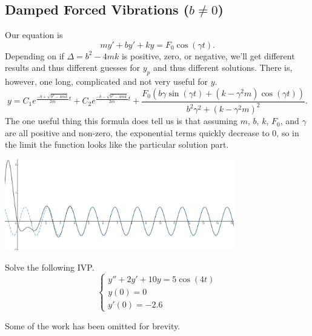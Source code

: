 \subsection{Damped Forced Vibrations ($b \neq 0$)}
\noindent
Our equation is 
\begin{equation*}
	my' + by' + ky = F_0\cos{(\gamma t)}.
\end{equation*}
Depending on if $\Delta = b^2 - 4mk$ is positive, zero, or negative, we'll get different results and thus different guesses for $y_p$ and thus different solutions.
There is, however, one long, complicated and not very useful for $y$.
\begin{equation*}
	y = C_1e^{\frac{-b+\sqrt{b^2-4mk}}{2m}t} + C_2e^{\frac{-b-\sqrt{b^2-4mk}}{2m}t} +
	 \frac{F_0\left(b\gamma\sin{(\gamma t)} + \left(k-\gamma^2m\right)\cos{(\gamma t)}\right)}{b^2\gamma^2 + (k-\gamma^2m)^2}.
\end{equation*}
The one useful thing this formula does tell us is that assuming $m$, $b$, $k$, $F_0$, and $\gamma$ are all positive and non-zero, the exponential terms quickly decrease to 0, so in the limit the function looks like the particular solution part.

\begin{center}
	\includegraphics[width=0.75\textwidth]{./higherOrder/forcedVibrs/damped_forced.png}
\end{center}

\begin{example}
	Solve the following IVP.
	\begin{equation*}
		\begin{cases}
			y'' + 2y' + 10y = 5\cos{(4t)} \\
			y(0) = 0 \\
			y'(0) = -2.6
		\end{cases}
	\end{equation*}
\end{example}
\noindent
Some of the work has been omitted for brevity.


